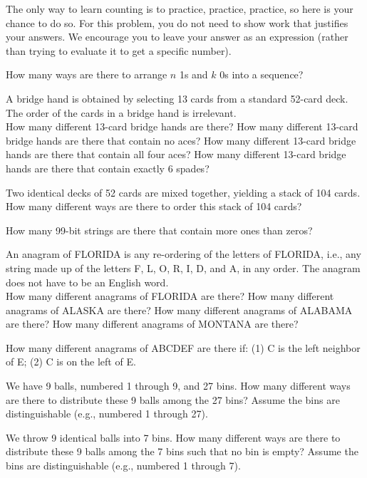 
The only way to learn counting is to practice, practice, practice, so
here is your chance to do so.
For this problem, you do not need to show work that justifies your answers.
We encourage you to leave your answer as an expression (rather than
trying to evaluate it to get a specific number).
\begin{Parts}

\Part How many ways are there to arrange $n$ 1s and $k$ 0s into a sequence?

\Part A bridge hand is obtained by selecting 13 cards from a standard
  52-card deck. The order of the cards in a bridge hand is
  irrelevant. \\
  How many different 13-card bridge hands are there? 
  How many different 13-card bridge hands are there that contain
  no aces? How many different 13-card bridge hands are there that contain
  all four aces? How many different 13-card bridge hands are there that contain
  exactly 6 spades?

\Part Two identical decks of 52 cards are mixed together, yielding a
  stack of 104 cards.
  How many different ways are there to order this stack of 104 cards?
  
\Part How many 99-bit strings are there that contain more ones than
  zeros?
  
\Part An anagram of FLORIDA is any re-ordering of the letters of FLORIDA, i.e., any
  string made up of the letters F, L, O, R, I, D, and A, in any order.
  The anagram does not have to be an English word. \\
  How many different anagrams of FLORIDA are there? How many different anagrams 
  of ALASKA are there? How many different anagrams of ALABAMA are there? 
  How many different anagrams of MONTANA are there?
 
\Part How many  different anagrams of ABCDEF are there if: (1) C is the left neighbor of E; (2) C is on the left of E.

\Part We have 9 balls, numbered 1 through 9, and 27 bins.
  How many different ways are there to distribute these 9 balls among
  the 27 bins? Assume the bins are distinguishable (e.g., numbered 1
  through 27).
  
\Part We throw 9 identical balls into 7 bins.
  How many different ways are there to distribute these 9 balls among
  the 7 bins such that no bin is empty? Assume the bins are
  distinguishable (e.g., numbered 1 through 7).
  

\end{Parts}
